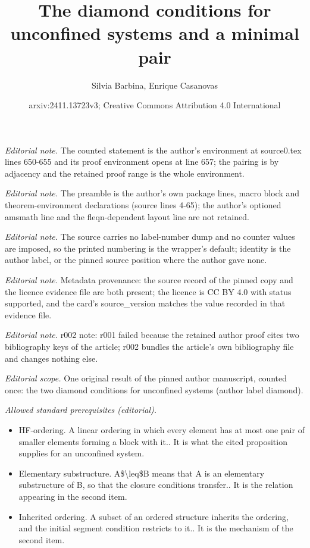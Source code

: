 \documentclass[10pt,a4paper]{article}
\title{The diamond conditions for unconfined systems and a minimal pair}
\author{Silvia Barbina, Enrique Casanovas}
\date{arxiv:2411.13723v3; Creative Commons Attribution 4.0 International}
\theoremstyle{note}
\begin{document}
\maketitle
\noindent\textit{Editorial note.} The counted statement is the author's environment at source0.tex lines 650-655 and its proof environment opens at line 657; the pairing is by adjacency and the retained proof range is the whole environment.\par\medskip
\noindent\textit{Editorial note.} The preamble is the author's own package lines, macro block and theorem-environment declarations (source lines 4-65); the author's optioned amsmath line and the fleqn-dependent layout line are not retained.\par\medskip
\noindent\textit{Editorial note.} The source carries no label-number dump and no counter values are imposed, so the printed numbering is the wrapper's default; identity is the author label, or the pinned source position where the author gave none.\par\medskip
\noindent\textit{Editorial note.} Metadata provenance: the source record of the pinned copy and the licence evidence file are both present; the licence is CC BY 4.0 with status supported, and the card's source\_version matches the value recorded in that evidence file.\par\medskip
\noindent\textit{Editorial note.} r002 note: r001 failed because the retained author proof cites two bibliography keys of the article; r002 bundles the article's own bibliography file and changes nothing else.\par\medskip
\noindent\textit{Editorial scope.} One original result of the pinned author manuscript, counted once: the two diamond conditions for unconfined systems (author label diamond).\par\medskip
\noindent\textit{Allowed standard prerequisites (editorial).}\begin{itemize}
\item HF-ordering. A linear ordering in which every element has at most one pair of smaller elements forming a block with it.. It is what the cited proposition supplies for an unconfined system.
\item Elementary substructure. A\$\textbackslash{}leq\$B means that A is an elementary substructure of B, so that the closure conditions transfer.. It is the relation appearing in the second item.
\item Inherited ordering. A subset of an ordered structure inherits the ordering, and the initial segment condition restricts to it.. It is the mechanism of the second item.
\end{itemize}\medskip
\end{document}
